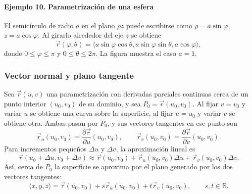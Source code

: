 \paragraph{Ejemplo 10. Parametrización de una esfera}
El semicírculo de radio $a$ en el plano $\rho z$ puede escribirse como $\rho=a\sin\varphi$, $z=a\cos\varphi$. Al girarlo alrededor del eje $z$ se obtiene
\[
\vec r(\varphi,\theta)=
\langle a\sin\varphi\cos\theta,
a\sin\varphi\sin\theta,a\cos\varphi\rangle,
\]
donde $0\leq\varphi\leq\pi$ y $0\leq\theta\leq2\pi$.
La figura muestra el caso $a=1$.

\begingroup\shorthandoff{>}
\begin{center}
\end{center}
\endgroup

\newpage
\subsubsection{Vector normal y plano tangente}

Sea $\vec r(u,v)$ una parametrización con derivadas parciales continuas cerca de un punto interior $(u_0,v_0)$ de su dominio, y sea $P_0=\vec r(u_0,v_0)$. Al fijar $v=v_0$ y variar $u$ se obtiene una curva sobre la superficie, al fijar $u=u_0$ y variar $v$ se obtiene otra. Ambas pasan por $P_0$, y sus vectores tangentes en ese punto son
\[
\vec r_u(u_0,v_0)=\frac{\partial\vec r}{\partial u}(u_0,v_0),
\qquad
\vec r_v(u_0,v_0)=\frac{\partial\vec r}{\partial v}(u_0,v_0).
\]
Para incrementos pequeños $\Delta u$ y $\Delta v$, la aproximación lineal es
\[
\vec r(u_0+\Delta u,v_0+\Delta v)
\approx \vec r(u_0,v_0)
+\vec r_u(u_0,v_0)\Delta u
+\vec r_v(u_0,v_0)\Delta v.
\]
Así, cerca de $P_0$ la superficie se aproxima por el plano generado por los dos vectores tangentes:
\[
\langle x,y,z\rangle
=\vec r(u_0,v_0)+s\vec r_u(u_0,v_0)+t\vec r_v(u_0,v_0),
\qquad s,t\in\mathbb R.
\]

